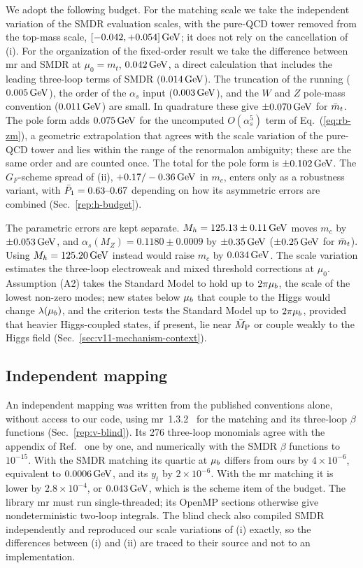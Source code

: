 We adopt the following budget.
For the matching scale we take the independent variation of the SMDR evaluation scales, with the pure-QCD tower removed from the top-mass scale, $[-0.042,+0.054]\,\mathrm{GeV}$; it does not rely on the cancellation of (i). %
For the organization of the fixed-order result we take the difference between mr and SMDR at $\mu_0=m_t$, $0.042\,\mathrm{GeV}$, a direct calculation that includes the leading three-loop terms of SMDR ($0.014\,\mathrm{GeV}$). %
The truncation of the running ($0.005\,\mathrm{GeV}$), the order of the $\alpha_s$ input ($0.003\,\mathrm{GeV}$), and the $W$ and $Z$ pole-mass convention ($0.011\,\mathrm{GeV}$) are small. %
In quadrature these give $\pm0.070\,\mathrm{GeV}$ for $\bar m_t$. %
The pole form adds $0.075\,\mathrm{GeV}$ for the uncomputed $O(\alpha_s^5)$ term of Eq.~(\ref{eq:rb-zm}), a geometric extrapolation that agrees with the scale variation of the pure-QCD tower and lies within the range of the renormalon ambiguity; these are the same order and are counted once. %
The total for the pole form is $\pm0.102\,\mathrm{GeV}$. %
The $G_F$-scheme spread of (ii), $+0.17/-0.36\,\mathrm{GeV}$ in $m_c$, enters only as a robustness variant, with $\bar P_1=0.63\text{--}0.67$ depending on how its asymmetric errors are combined (Sec.~\ref{rep:h-budget}). %

The parametric errors are kept separate.
$M_h=125.13\pm0.11\,\mathrm{GeV}$ moves $m_c$ by $\pm0.053\,\mathrm{GeV}$, and $\alpha_s(M_Z)=0.1180\pm0.0009$ by $\pm0.35\,\mathrm{GeV}$ ($\pm0.25\,\mathrm{GeV}$ for $\bar m_t$). %
Using $M_h=125.20\,\mathrm{GeV}$ instead would raise $m_c$ by $0.034\,\mathrm{GeV}$. %
The scale variation estimates the three-loop electroweak and mixed threshold corrections at $\mu_0$.
Assumption (A2) takes the Standard Model to hold up to $2\pi\mu_b$, the scale of the lowest non-zero modes; new states below $\mu_b$ that couple to the Higgs would change $\lambda(\mu_b)$, and the criterion tests the Standard Model up to $2\pi\mu_b$, provided that heavier Higgs-coupled states, if present, lie near $\bar M_{\mathrm{P}}$ or couple weakly to the Higgs field (Sec.~\ref{sec:v11-mechanism-context}).

\subsection{Independent mapping}
\label{sec:rb-sm-blind}

An independent mapping was written from the published conventions alone, without access to our code, using mr~1.3.2~\cite{Kniehl:2016enc} for the matching and its three-loop $\beta$ functions (Sec.~\ref{rep:v-blind}).
Its 276 three-loop monomials agree with the appendix of Ref.~\cite{Buttazzo:2013uya} one by one, and numerically with the SMDR $\beta$ functions to $10^{-15}$. %
With the SMDR matching its quartic at $\mu_b$ differs from ours by $4\times10^{-6}$, equivalent to $0.0006\,\mathrm{GeV}$, and its $y_t$ by $2\times10^{-6}$. %
With the mr matching it is lower by $2.8\times10^{-4}$, or $0.043\,\mathrm{GeV}$, which is the scheme item of the budget. %
The library mr must run single-threaded; its OpenMP sections otherwise give nondeterministic two-loop integrals.
The blind check also compiled SMDR independently and reproduced our scale variations of (i) exactly, so the differences between (i) and (ii) are traced to their source and not to an implementation.
